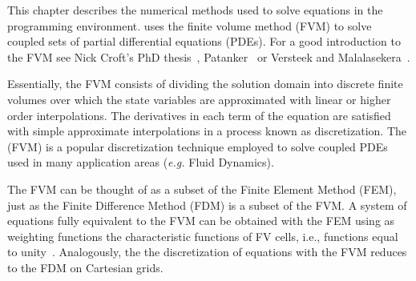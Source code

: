 This chapter describes the numerical methods used to solve equations
in the \FiPy{} programming environment. \FiPy{} uses the finite volume
method (FVM) to solve coupled sets of partial differential equations
(PDEs). For a good introduction to the FVM see Nick Croft's PhD
thesis~\cite{croftphd}, Patanker~\cite{patanker} or Versteek and
Malalasekera~\cite{versteegMalalasekera}.

Essentially, the FVM consists of dividing the solution domain into
discrete finite volumes over which the state variables are
approximated with linear or higher order interpolations. The
derivatives in each term of the equation are satisfied with simple
approximate interpolations in a process known as discretization. The
(FVM) is a popular discretization technique employed to solve coupled
PDEs used in many application areas (\emph{e.g.} Fluid Dynamics).

The FVM can be thought of as a subset of the Finite Element Method
(FEM), just as the Finite Difference Method (FDM) is a subset of the FVM. A
system of equations fully equivalent to the FVM can be obtained with
the FEM using as weighting functions the characteristic functions of
FV cells, i.e., functions equal to unity~\cite{mattiussi:1997}. Analogously,
the the discretization of equations with the FVM reduces to the FDM on
Cartesian grids.






